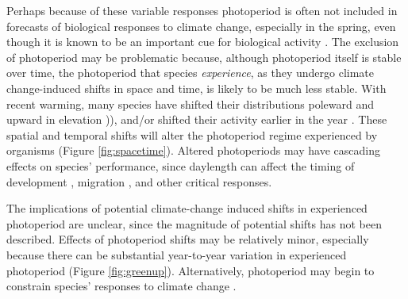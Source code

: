 \documentclass{article}
\begin{document}
\par Perhaps because of these variable responses photoperiod is often not included in forecasts of biological responses to climate change, especially in the spring, even though it is known to be an important cue for biological activity \citep[but see ][]{duputie2015,Caffarra:2011qf}. 
The exclusion of photoperiod may be problematic because, although photoperiod itself is stable over time, the photoperiod that species \emph{experience}, as they undergo climate change-induced shifts in space and time, is likely to be much less stable.%
With recent warming, many species have shifted their distributions poleward and upward in elevation \citep[i.e., range shifts][]{parmesan2006,chen2011,harsch2009,penuelas2003})), and/or shifted their activity earlier in the year \citep[i.e., phenological shifts][]{parmesan2006, Wolkovich:2012n}. These spatial and temporal shifts will alter the photoperiod regime experienced by organisms (Figure \ref{fig:spacetime}). Altered photoperiods may have cascading effects on species' performance, since daylength can affect the timing of development \citep{muir1994}, migration \citep{dawbin1966}, and other critical responses. 
\par The implications of potential climate-change induced shifts in experienced photoperiod are unclear, since the magnitude of potential shifts has not been described. Effects of photoperiod shifts may be relatively minor, especially because there can be substantial year-to-year variation in experienced photoperiod (Figure \ref{fig:greenup}).%
Alternatively, photoperiod may begin to constrain species' responses to climate change \citep{koerner2010b}.%
\end{document}
